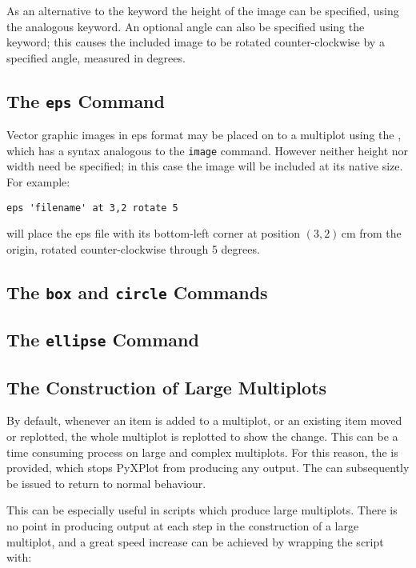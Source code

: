 As an alternative to the  keyword the height of the image can be
specified, using the analogous  keyword.  An optional angle can
also be specified using the  keyword; this causes the included
image to be rotated counter-clockwise by a specified angle, measured in
degrees.

\subsection{The {\tt eps} Command}

Vector graphic images in eps format may be placed on to a multiplot using the
, which has a syntax analogous to the {\tt image} command.
However neither height nor width need be specified; in this case the image will
be included at its native size.  For example:

\begin{verbatim}
eps 'filename' at 3,2 rotate 5
\end{verbatim}

\noindent will place the eps file with its bottom-left corner at position
$(3,2)$\,cm from the origin, rotated counter-clockwise through 5 degrees.

\subsection{The {\tt box} and {\tt circle} Commands}

\subsection{The {\tt ellipse} Command}

\subsection{The Construction of Large Multiplots}
\label{sec:set_display}

By default, whenever an item is added to a multiplot, or an existing item moved
or replotted, the whole multiplot is replotted to show the change. This can be
a time consuming process on large and complex multiplots. For this reason, the
 is provided, which stops PyXPlot from producing any
output. The  can subsequently be issued to return to
normal behaviour.

This can be especially useful in scripts which produce large multiplots. There
is no point in producing output at each step in the construction of a large
multiplot, and a great speed increase can be achieved by wrapping the script
with:

